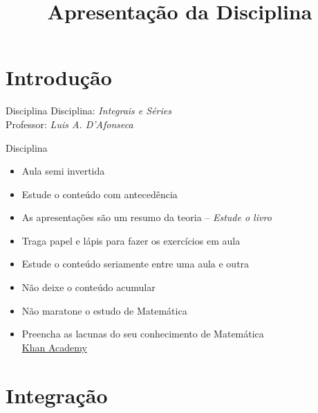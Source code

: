 
\usepackage{integracao_e_series}

\title{Apresentação da Disciplina}



\addtitle

\section{Introdução}

\begin{frame}{Disciplina}
   Disciplina: \emph{\large Integrais e Séries}\\[7mm]
   Professor: \emph{\large Luis A. D'Afonseca}
\end{frame}

\begin{frame}{Disciplina}
\begin{itemize}[<+->]
  \item Aula semi invertida
  \item Estude o conteúdo com antecedência
  \item As apresentações são um resumo da teoria -- \emph{Estude o livro}
  \item Traga papel e lápis para fazer os exercícios em aula
  \item Estude o conteúdo seriamente entre uma aula e outra
  \item Não deixe o conteúdo acumular
  \item Não maratone o estudo de Matemática
  \item Preencha as lacunas do seu conhecimento de Matemática \\
        \href{https://pt.khanacademy.org}{Khan Academy}
\end{itemize}
\end{frame}

\section{Integração}

